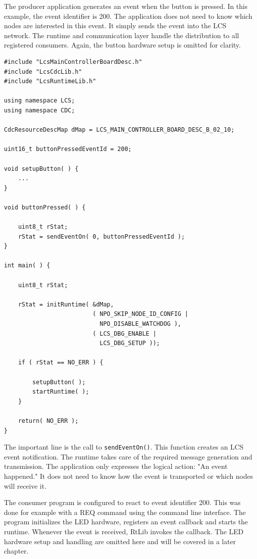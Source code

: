 
The producer application generates an event when the button is pressed. In this
example, the event identifier is 200.
The application does not need to know which nodes are interested in this event.
It simply sends the event into the LCS network. The runtime and communication
layer handle the distribution to all registered consumers.
Again, the button hardware setup is omitted for clarity.

\begin{lstlisting}[style=codesnippetstyle]
#include "LcsMainControllerBoardDesc.h"
#include "LcsCdcLib.h"
#include "LcsRuntimeLib.h"

using namespace LCS;
using namespace CDC;

CdcResourceDescMap dMap = LCS_MAIN_CONTROLLER_BOARD_DESC_B_02_10;

uint16_t buttonPressedEventId = 200;

void setupButton( ) {
    ...
}

void buttonPressed( ) {

    uint8_t rStat;
    rStat = sendEventOn( 0, buttonPressedEventId );
}

int main( ) {

    uint8_t rStat;

    rStat = initRuntime( &dMap,
                         ( NPO_SKIP_NODE_ID_CONFIG |
                           NPO_DISABLE_WATCHDOG ),
                         ( LCS_DBG_ENABLE |
                           LCS_DBG_SETUP ));

    if ( rStat == NO_ERR ) {

        setupButton( );
        startRuntime( );
    }

    return( NO_ERR );
}
\end{lstlisting}

The important line is the call to \texttt{sendEventOn()}. This function creates
an LCS event notification. The runtime takes care of the required message
generation and transmission.
The application only expresses the logical action: "An event happened."
It does not need to know how the event is transported or which nodes will
receive it.


The consumer program is configured to react to event identifier 200. 
This was done for example with a REQ command using the command line interface.
The program initializes the LED hardware, registers an event callback and starts
the runtime. Whenever the event is received, RtLib invokes the callback.
The LED hardware setup and handling are omitted here and will be covered in a
later chapter.

